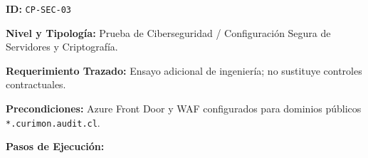 \par\noindent\textbf{ID:} \texttt{C\allowbreak{}P\allowbreak{}-\allowbreak{}S\allowbreak{}E\allowbreak{}C\allowbreak{}-\allowbreak{}0\allowbreak{}3\allowbreak{}}\par
\par\noindent\textbf{Nivel y Tipología:} Prueba de Ciberseguridad / Configuración Segura de Servidores y Criptografía.\par
\par\noindent\textbf{Requerimiento Trazado:} Ensayo adicional de ingeniería; no sustituye controles contractuales.\par
\par\noindent\textbf{Precondiciones:} Azure Front Door y WAF configurados para dominios públicos \texttt{*\allowbreak{}.\allowbreak{}c\allowbreak{}u\allowbreak{}r\allowbreak{}i\allowbreak{}m\allowbreak{}o\allowbreak{}n\allowbreak{}.\allowbreak{}a\allowbreak{}u\allowbreak{}d\allowbreak{}i\allowbreak{}t\allowbreak{}.\allowbreak{}c\allowbreak{}l\allowbreak{}}.\par
\par\noindent\textbf{Pasos de Ejecución:} \par
